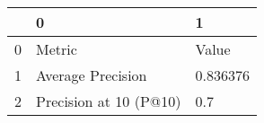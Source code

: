 \begin{tabular}{lll}
\toprule
{} &                       0 &         1 \\
\midrule
0 &                  Metric &     Value \\
1 &       Average Precision &  0.836376 \\
2 &  Precision at 10 (P@10) &       0.7 \\
\bottomrule
\end{tabular}
